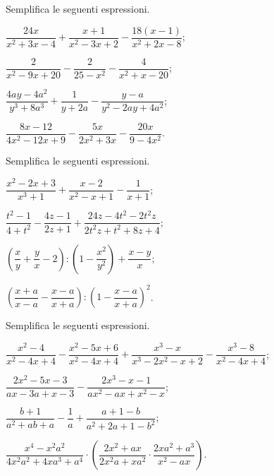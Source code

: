 \begin{esercizio}[\Ast]
\label{ese:14.35}
Semplifica le seguenti espressioni.
\begin{multicols}{2}
\begin{enumeratea}
 \item $\dfrac{24x}{x^{2}+3x-4}+\dfrac{x+1}{x^{2}-3x+2}-\dfrac{18(x-1)}{x^{2}+2x-8}$;
 \item $\dfrac{2}{x^{2}-9x+20}-\dfrac{2}{25-x^{2}}-\dfrac{4}{x^{2}+x-20}$;
 \item $\dfrac{4ay-4a^{2}}{y^{3}+8a^{3}}+\dfrac{1}{y+2a}-\dfrac{y-a}{y^{2}-2ay+4a^{2}}$;
 \item $\dfrac{8x-12}{4x^{2}-12x+9}-\dfrac{5x}{2x^{2}+3x}-\dfrac{20x}{9-4x^{2}}$.
\end{enumeratea}
\end{multicols}
\end{esercizio}

\begin{esercizio}[\Ast]
\label{ese:14.36}
Semplifica le seguenti espressioni.
\begin{multicols}{2}
\begin{enumeratea}
 \item $\dfrac{x^{{2}}-2x+3}{x^{{3}}+1}+\dfrac{x-2}{x^{{2}}-x+1}-\dfrac{1}{x+1}$;
 \item $\dfrac{t^{2}-1}{4+t^{2}}-\dfrac{4z-1}{2z+1}+\dfrac{24z-4t^{2}-2t^{2}z}{2t^{2}z+t^{2}+8z+4}$;
 \item $\left(\dfrac{x}{y}+\dfrac{y}{x}-2\right):\left(1-\dfrac{x^{2}}{y^{2}}\right)+\dfrac{x-y}{x}$;
 \item $\left(\dfrac{x+a}{x-a}-\dfrac{x-a}{x+a}\right):\left(1-\dfrac{x-a}{x+a}\right)^{2}$.
\end{enumeratea}
\end{multicols}
\end{esercizio}

\begin{esercizio}[\Ast]
\label{ese:14.37}
Semplifica le seguenti espressioni.
\begin{enumeratea}
 \item $\dfrac{x^{2}-4}{x^{2}-4x+4}-\dfrac{x^{2}-5x+6}{x^{2}-4x+4}+\dfrac{x^{3}-x}{x^{3}-2x^{2}-x+2}-\dfrac{x^{3}-8}{x^{2}-4x+4}$;
 \item $\dfrac{2x^{2}-5x-3}{ax-3a+x-3}-\dfrac{2x^{3}-x-1}{ax^{2}-ax+x^{2}-x}$;
 \item $\dfrac{b+1}{a^{2}+ab+a}-\dfrac{1}{a}+\dfrac{a+1-b}{a^{2}+2a+1-b^{2}}$;
 \item $\dfrac{x^{4}-x^{2}a^{2}}{4x^{2}a^{2}+4xa^{3}+a^{4}}\cdot\left(\dfrac{2x^{2}+ax}{2x^{2}a+xa^{2}}\cdot{\dfrac{2xa^{2}+a^{3}}{x^{2}-ax}}\right)$.
\end{enumeratea}
\end{esercizio}

